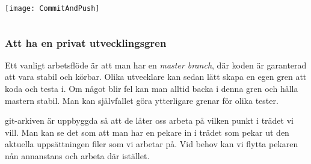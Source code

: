 \documentclass[swedish]{beamer}
\newenvironment{dialogue}{%
\VerbatimEnvironment
\begin{Verbatim}[fontsize=\footnotesize,commandchars=\#\(\)]%
}
{%
\end{Verbatim}
}
\begin{document}
\begin{frame}[fragile]
\begin{columns}
\begin{column}{0.5\textwidth}

\vspace{\baselineskip}

\texttt{[image: CommitAndPush]}
\end{column}
\end{columns}
\end{frame}







\begin{frame}[fragile]
\frametitle{Att ha en privat utvecklingsgren}
Ett vanligt arbetsflöde är att man har en \emph{master branch}, där koden är garanterad att vara stabil och körbar.  Olika utvecklare kan sedan lätt skapa en egen gren att koda och testa i.  Om något blir fel kan man alltid backa i denna gren och hålla mastern stabil.  Man kan självfallet göra ytterligare grenar för olika tester.

git-arkiven är uppbyggda så att de låter oss arbeta på vilken punkt i trädet vi vill.  Man kan se det som att man har en pekare in i trädet som pekar ut den aktuella uppsättningen filer som vi arbetar på.  Vid behov kan vi flytta pekaren nån annanstans och arbeta där istället.
\end{frame}
\end{document}

